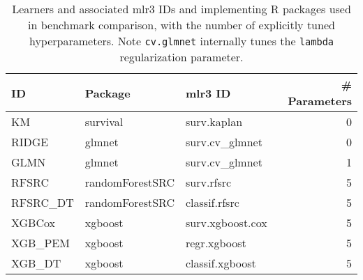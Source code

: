 \begin{table}

\caption{Learners and associated mlr3 IDs and implementing R packages used in benchmark comparison, with the number of explicitly tuned hyperparameters. Note \texttt{cv.glmnet} internally tunes the \texttt{lambda} regularization parameter. \label{tab:bm-learners}}
\centering
\begin{tabular}[t]{lllr}
\toprule
ID & Package & mlr3 ID & \# Parameters\\
\midrule
KM & survival & surv.kaplan & 0\\
RIDGE & glmnet & surv.cv\_glmnet & 0\\
GLMN & glmnet & surv.cv\_glmnet & 1\\
RFSRC & randomForestSRC & surv.rfsrc & 5\\
RFSRC\_DT & randomForestSRC & classif.rfsrc & 5\\
XGBCox & xgboost & surv.xgboost.cox & 5\\
XGB\_PEM & xgboost & regr.xgboost & 5\\
XGB\_DT & xgboost & classif.xgboost & 5\\
\bottomrule
\end{tabular}
\end{table}
